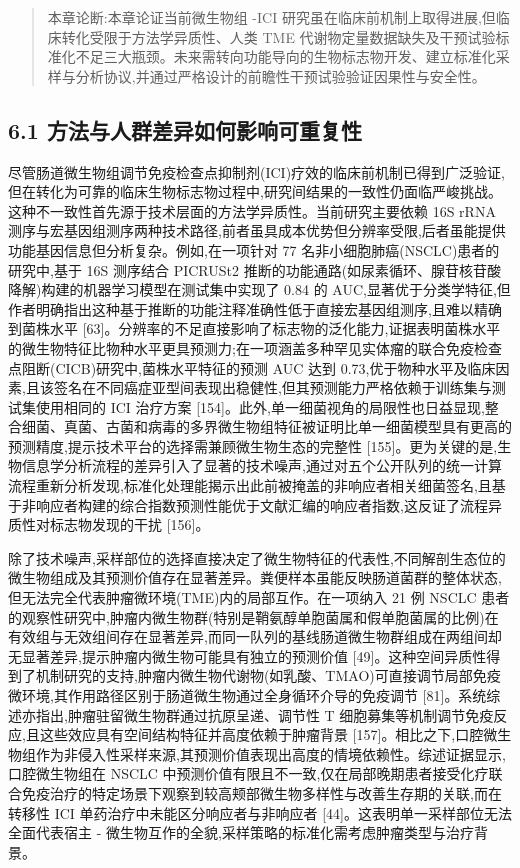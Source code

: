 \documentclass[11pt]{article}
\begin{document}
\begin{quote}
本章论断:本章论证当前微生物组 -ICI 研究虽在临床前机制上取得进展,但临床转化受限于方法学异质性、人类 TME 代谢物定量数据缺失及干预试验标准化不足三大瓶颈。未来需转向功能导向的生物标志物开发、建立标准化采样与分析协议,并通过严格设计的前瞻性干预试验验证因果性与安全性。
\end{quote}

\subsection{6.1 方法与人群差异如何影响可重复性}\label{ux65b9ux6cd5ux4e0eux4ebaux7fa4ux5deeux5f02ux5982ux4f55ux5f71ux54cdux53efux91cdux590dux6027}

尽管肠道微生物组调节免疫检查点抑制剂(ICI)疗效的临床前机制已得到广泛验证,但在转化为可靠的临床生物标志物过程中,研究间结果的一致性仍面临严峻挑战。这种不一致性首先源于技术层面的方法学异质性。当前研究主要依赖 16S rRNA 测序与宏基因组测序两种技术路径,前者虽具成本优势但分辨率受限,后者虽能提供功能基因信息但分析复杂。例如,在一项针对 77 名非小细胞肺癌(NSCLC)患者的研究中,基于 16S 测序结合 PICRUSt2 推断的功能通路(如尿素循环、腺苷核苷酸降解)构建的机器学习模型在测试集中实现了 0.84 的 AUC,显著优于分类学特征,但作者明确指出这种基于推断的功能注释准确性低于直接宏基因组测序,且难以精确到菌株水平 {[}63{]}。分辨率的不足直接影响了标志物的泛化能力,证据表明菌株水平的微生物特征比物种水平更具预测力;在一项涵盖多种罕见实体瘤的联合免疫检查点阻断(CICB)研究中,菌株水平特征的预测 AUC 达到 0.73,优于物种水平及临床因素,且该签名在不同癌症亚型间表现出稳健性,但其预测能力严格依赖于训练集与测试集使用相同的 ICI 治疗方案 {[}154{]}。此外,单一细菌视角的局限性也日益显现,整合细菌、真菌、古菌和病毒的多界微生物组特征被证明比单一细菌模型具有更高的预测精度,提示技术平台的选择需兼顾微生物生态的完整性 {[}155{]}。更为关键的是,生物信息学分析流程的差异引入了显著的技术噪声,通过对五个公开队列的统一计算流程重新分析发现,标准化处理能揭示出此前被掩盖的非响应者相关细菌签名,且基于非响应者构建的综合指数预测性能优于文献汇编的响应者指数,这反证了流程异质性对标志物发现的干扰 {[}156{]}。

除了技术噪声,采样部位的选择直接决定了微生物特征的代表性,不同解剖生态位的微生物组成及其预测价值存在显著差异。粪便样本虽能反映肠道菌群的整体状态,但无法完全代表肿瘤微环境(TME)内的局部互作。在一项纳入 21 例 NSCLC 患者的观察性研究中,肿瘤内微生物群(特别是鞘氨醇单胞菌属和假单胞菌属的比例)在有效组与无效组间存在显著差异,而同一队列的基线肠道微生物群组成在两组间却无显著差异,提示肿瘤内微生物可能具有独立的预测价值 {[}49{]}。这种空间异质性得到了机制研究的支持,肿瘤内微生物代谢物(如乳酸、TMAO)可直接调节局部免疫微环境,其作用路径区别于肠道微生物通过全身循环介导的免疫调节 {[}81{]}。系统综述亦指出,肿瘤驻留微生物群通过抗原呈递、调节性 T 细胞募集等机制调节免疫反应,且这些效应具有空间结构特征并高度依赖于肿瘤背景 {[}157{]}。相比之下,口腔微生物组作为非侵入性采样来源,其预测价值表现出高度的情境依赖性。综述证据显示,口腔微生物组在 NSCLC 中预测价值有限且不一致,仅在局部晚期患者接受化疗联合免疫治疗的特定场景下观察到较高颊部微生物多样性与改善生存期的关联,而在转移性 ICI 单药治疗中未能区分响应者与非响应者 {[}44{]}。这表明单一采样部位无法全面代表宿主 - 微生物互作的全貌,采样策略的标准化需考虑肿瘤类型与治疗背景。
\end{document}
